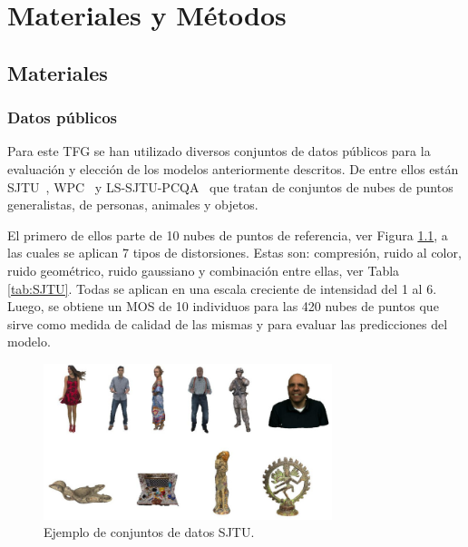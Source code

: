 \chapter{Materiales y Métodos}
\section{Materiales}
\subsection{Datos públicos} 
\label{sec:DatosPublicos}
Para este TFG se han utilizado diversos conjuntos de datos públicos para la 
evaluación y elección de los modelos anteriormente descritos. De entre ellos 
están SJTU~\cite{SJTU}, WPC~\cite{WPC1,WPC2} y LS-SJTU-PCQA~\cite{ResSCNN} que tratan 
de conjuntos de nubes de puntos generalistas, de personas, animales y objetos.

El primero de ellos parte de 10 nubes de puntos de referencia, ver Figura \ref{fig:SJTU}, 
a las cuales se aplican 7 tipos de distorsiones. Estas son: compresión, ruido 
al color, ruido geométrico, ruido gaussiano y combinación entre ellas, ver Tabla \ref{tab:SJTU}. Todas se aplican en una escala creciente
de intensidad del 1 al 6. Luego, se obtiene un MOS de 10 individuos para las 420 
nubes de puntos que sirve como medida de calidad de las mismas y para evaluar las predicciones del modelo.

\begin{figure}[htp]
  \centering 
    \includegraphics[width=0.75\textwidth]{imagenes/chapter4/SJTU}
    \caption{Ejemplo de conjuntos de datos SJTU.}
    \label{fig:SJTU}
\end{figure}

